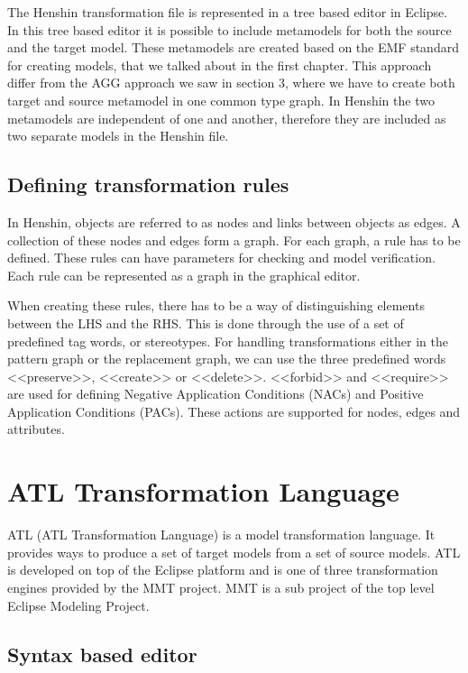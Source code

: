 \documentclass[pdftex,11pt,a4paper]{article}
\begin{document}
The Henshin transformation file is represented in a tree based editor in
Eclipse. In this tree based editor it is possible to include metamodels for both
the source and the target model. These metamodels are created based on the EMF
standard for creating models, that we talked about in the first chapter.
This approach differ from the AGG approach we saw in section 3, where we have
to create both target and source metamodel in one common type graph. In Henshin
the two metamodels are independent of one and another, therefore they are
included as two separate models in the Henshin file. 

\subsection{Defining transformation rules}

\noindent In Henshin, objects are referred to as nodes and links between objects
as edges. A collection of these nodes and edges form a graph. For each graph, a
rule has to be defined. These rules can have parameters for checking and model
verification. Each rule can be represented as a graph in the graphical
editor. 

\indent When creating these rules, there has to be a way of
distinguishing elements between the LHS and the RHS. This is done through the
use of a set of predefined tag words, or stereotypes. For handling transformations
either in the pattern graph or the replacement graph, we can use the three
predefined words <<preserve>>, <<create>> or <<delete>>. <<forbid>> and
<<require>> are used for defining Negative Application Conditions (NACs) and
Positive Application Conditions (PACs). These actions are supported for nodes,
edges and attributes. 

\section{ATL Transformation Language}

\noindent ATL\cite{ATL} (ATL Transformation Language) is a model transformation
language. It provides ways to produce a set of target models from a set of
source models. ATL is developed on top of the Eclipse platform and is one of
three transformation engines provided by the MMT project\cite{MMT}. MMT is a
sub project of the top level Eclipse Modeling Project\cite{EMP}. 

\subsection{Syntax based editor}
\end{document}
